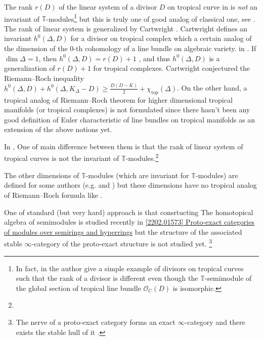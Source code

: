 \documentclass[a4paper,dvipdfmx,reqno,12pt]{amsart}
\theoremstyle{definition}
\newcommand{\mb}[1]{\mathbb{#1}}%
\newcommand{\mcal}[1]{\mathcal{#1}}%
\newcommand{\opn}[1]{\operatorname{#1}}
\numberwithin{equation}{section}
\begin{document}
The rank $r(D)$ of the linear system of a divisor $D$ 
on tropical curve in 
\cite{gathmannRiemannRochTheoremTropical2008a}
is \emph{not} an invariant of $\mb{T}$-modules\footnote{
In fact, in \cite[Example 6.5]{yoshitomi2011generators} 
the author give a simple example of divisors on 
tropical curves such that 
the rank of a divisor is different even though 
the $\mathbb{T}$-semimodule of the global section of 
tropical line bundle $\mcal{O}_C(D)$ is isomorphic. }
but this is truly one of good analog of classical one,
see \cite[Lemma 2.4]{MR2448666}.
The rank of linear system is generalized by Cartwright
\cite{MR4131998,MR4251610}.
Cartwright defines an invariant 
$h^{0}(\Delta,D)$ for a divisor on tropical complex
which a certain analog of the dimension of
the $0$-th cohomology of a line bundle on algebraic 
variety.
in \cite[Definition 3.1]{MR4251610}.
If $\dim \Delta=1$, then $h^{0}(\Delta,D)=r(D)+1$
\cite[Proposition 3.3]{MR4251610}, and thus $h^{0}(\Delta,D)$
is a generalization of $r(D)+1$ for tropical complexes. 
Cartwright conjectured the Riemann--Roch inequality
$h^{0}(\Delta,D)+h^{0}(\Delta,K_{\Delta}-D)\geq 
\frac{D(D-K)}{2}+\chi_{\opn{top}}(\Delta)$.
On the other hand, a tropical analog of Riemann--Roch theorem
for higher dimensional tropical manifolds 
(or tropical complexes) is not formulated
since there hasn't been any good definition of 
Euler characteristic of line bundles on tropical 
manifolds as an extension of the above notions yet.

In \cite{MR3903579},
One of main difference between them is that 
the rank of linear system of tropical curves is
not the invariant of $\mb{T}$-modules.\footnote{}

The other dimensions of $\mb{T}$-modules 
(which are invariant for $\mb{T}$-modules) are defined for 
some authors (e.g. \cite[Definition 2.3]{mikhalkinTropicalCurvesTheir2008a}
and \cite[p.8]{yoshitomi2011generators}) but 
these dimensions have no tropical analog of 
Riemann--Roch formula like 
\cite{MR2355607,gathmannRiemannRochTheoremTropical2008a}.

One of standard (but very hard) approach is that 
consrtucting 
The homotopical algebra of semimodules is 
studied recently in 
\href{https://arxiv.org/abs/2202.01573}{[2202.01573] Proto-exact categories of modules over semirings and hyperrings}
but the structure of the associated 
stable $\infty$-category of the proto-exact structure
is not studied yet.
\footnote{The nerve of a proto-exact category
forms an exact $\infty$-category 
\cite[Example 7.2.3]{MR3970975} and there exists the
stable hull of it 
\cite{https://doi.org/10.48550/arxiv.2010.04957}.}
\end{document}
